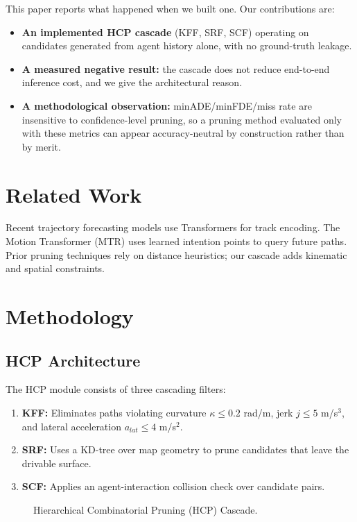 \documentclass[10pt,journal,compsoc]{IEEEtran}
\begin{document}
This paper reports what happened when we built one. Our contributions are:
\begin{itemize}
  \item \textbf{An implemented HCP cascade} (KFF, SRF, SCF) operating on
        candidates generated from agent history alone, with no ground-truth
        leakage.
  \item \textbf{A measured negative result:} the cascade does not reduce
        end-to-end inference cost, and we give the architectural reason.
  \item \textbf{A methodological observation:} minADE/minFDE/miss rate are
        insensitive to confidence-level pruning, so a pruning method evaluated
        only with these metrics can appear accuracy-neutral by construction
        rather than by merit.
\end{itemize}

\section{Related Work}
Recent trajectory forecasting models use Transformers for track encoding. The
Motion Transformer (MTR) uses learned intention points to query future paths.
Prior pruning techniques rely on distance heuristics; our cascade adds
kinematic and spatial constraints.

\section{Methodology}
\subsection{HCP Architecture}
The HCP module consists of three cascading filters:
\begin{enumerate}
  \item \textbf{KFF:} Eliminates paths violating curvature $\kappa \le 0.2$
        rad/m, jerk $j \le 5$ m/s$^3$, and lateral acceleration
        $a_{lat} \le 4$ m/s$^2$.
  \item \textbf{SRF:} Uses a KD-tree over map geometry to prune candidates
        that leave the drivable surface.
  \item \textbf{SCF:} Applies an agent-interaction collision check over
        candidate pairs.
\end{enumerate}

\begin{figure}[h]
\centering
{}
\caption{Hierarchical Combinatorial Pruning (HCP) Cascade.}
\label{fig:hcp}
\end{figure}
\end{document}
